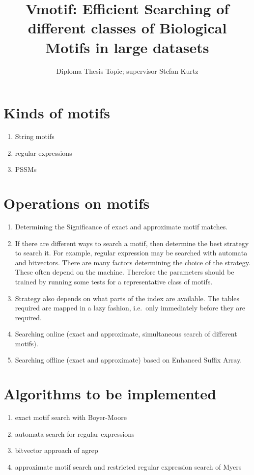 \documentclass[12pt,a4paper]{article}
\title{Vmotif: Efficient Searching of different classes of Biological Motifs
in large datasets}
\author{Diploma Thesis Topic; supervisor Stefan Kurtz}
\begin{document}
\maketitle
\section{Kinds of motifs}
\begin{enumerate}
\item
String motifs
\item
regular expressions 
\item
PSSMs
\end{enumerate}

\section{Operations on motifs}

\begin{enumerate}
\item
Determining the Significance of exact and approximate motif matches.
\item
If there are different ways to search a motif, then
determine the best strategy to search it. For example,
regular expression may be searched with automata and bitvectors.
There are many factors determining the choice of the strategy. These
often depend on the machine. Therefore the parameters should be
trained by running some tests for a representative class
of motifs.
\item
Strategy also depends on what parts of the index are 
available. The tables required are mapped in a lazy fashion,
i.e.\ only immediately before they are required.
\item
Searching online (exact and approximate, simultaneous search of 
different motifs).
\item
Searching offline (exact and approximate) based on Enhanced Suffix Array.
\end{enumerate}

\section{Algorithms to be implemented}

\begin{enumerate}
\item
exact motif search with Boyer-Moore
\item
automata search for regular expressions
\item
bitvector approach of agrep
\item
approximate motif search and restricted regular expression search of Myers
\end{enumerate}
\end{document}
